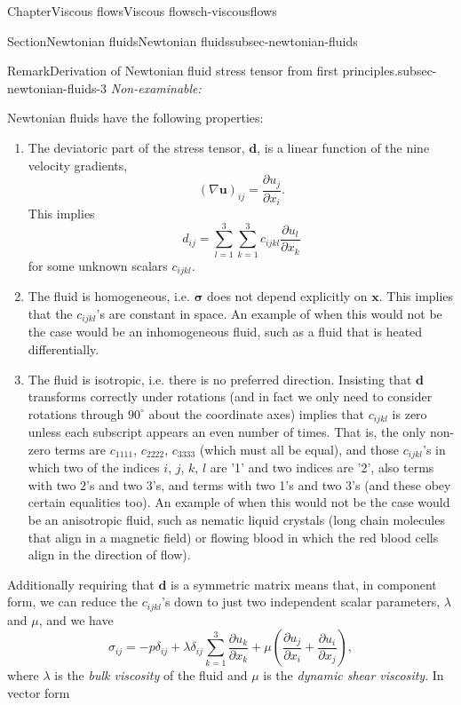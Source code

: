 \documentclass[oneside,10pt,]{book}
\numberwithin{equation}{section}
\newcommand{\pd}[2]{\frac{\partial#1}{\partial#2}}
\newcommand{\bx}{\boldsymbol{x}}
\newcommand{\bu}{\boldsymbol{u}}
\newcommand{\bsigma}{\boldsymbol{\sigma}}
\newcommand{\bd}{\boldsymbol{d}}
\begin{document}
\begin{chapterptx}{Chapter}{Viscous flows}{}{Viscous flows}{}{}{ch-viscousflows}
\begin{sectionptx}{Section}{Newtonian fluids}{}{Newtonian fluids}{}{}{subsec-newtonian-fluids}
\begin{remark}{Remark}{Derivation of Newtonian fluid stress tensor from first principles.}{subsec-newtonian-fluids-3}
\emph{Non-examinable:}%
\par
Newtonian fluids have the following properties:%
\begin{enumerate}
\item{}The deviatoric part of the stress tensor, \(\bd\), is a linear function of the nine velocity gradients,%
\begin{equation*}
(\nabla\bu)_{ij}=\pd{u_j}{x_i}.
\end{equation*}
This implies%
\begin{equation*}
d_{ij}=\sum_{l=1}^3\sum_{k=1}^3c_{ijkl}\pd{u_l}{x_k}
\end{equation*}
for some unknown scalars \(c_{ijkl}\).%
\item{}The fluid is homogeneous, i.e. \(\bsigma\) does not depend explicitly on \(\bx\). This implies that the \(c_{ijkl}\)'s are constant in space. An example of when this would not be the case would be an inhomogeneous fluid, such as a fluid that is heated differentially.%
\item{}The fluid is isotropic, i.e. there is no preferred direction. Insisting that \(\bd\) transforms correctly under rotations (and in fact we only need to consider rotations through \(90^\circ\) about the coordinate axes) implies that \(c_{ijkl}\) is zero unless each subscript appears an even number of times. That is, the only non-zero terms are \(c_{1111}\), \(c_{2222}\), \(c_{3333}\) (which must all be equal), and those \(c_{ijkl}\)'s in which two of the indices \(i\), \(j\), \(k\), \(l\) are '1' and two indices are '2', also terms with two \textasciigrave{}2's and two \textasciigrave{}3's, and terms with two \textasciigrave{}1's and two \textasciigrave{}3's (and these obey certain equalities too). An example of when this would not be the case would be an anisotropic fluid, such as nematic liquid crystals (long chain molecules that align in a magnetic field) or flowing blood in which the red blood cells align in the direction of flow).%
\end{enumerate}
Additionally requiring that \(\bd\) is a symmetric matrix means that, in component form, we can reduce the \(c_{ijkl}\)'s down to just two independent scalar parameters, \(\lambda\) and \(\mu\), and we have%
\begin{equation}
\sigma_{ij}=-p\delta_{ij}+\lambda\delta_{ij}\sum_{k=1}^3\pd{u_k}{x_k}
+\mu\left(\pd{u_j}{x_i}+\pd{u_i}{x_j}\right),\label{eq-Newtonianstress}
\end{equation}
where \(\lambda\) is the \emph{bulk viscosity} of the fluid and \(\mu\) is the \emph{dynamic shear viscosity}. In vector form%

\end{remark}
\end{sectionptx}
\end{chapterptx}
\end{document}

